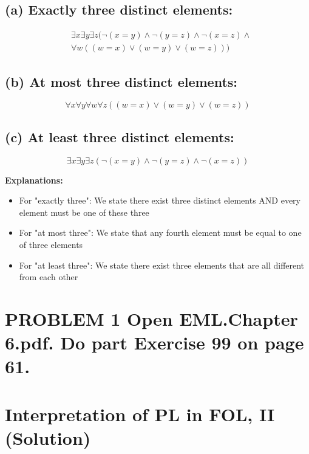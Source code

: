 \documentclass{article}
\begin{document}
\subsection*{(a) Exactly three distinct elements:}
\[\begin{aligned}
& \exists x \exists y \exists z (\neg(x = y) \land \neg(y = z) \land \neg(x = z) \land \\
& \forall w ((w = x) \lor (w = y) \lor (w = z)))
\end{aligned}\]

\subsection*{(b) At most three distinct elements:}
\[\forall x \forall y \forall w \forall z ((w = x) \lor (w = y) \lor (w = z))\]

\subsection*{(c) At least three distinct elements:}
\[\exists x \exists y \exists z (\neg(x = y) \land \neg(y = z) \land \neg(x = z))\]

\textbf{Explanations:}
\begin{itemize}
    \item For "exactly three": We state there exist three distinct elements AND every element must be one of these three
    \item For "at most three": We state that any fourth element must be equal to one of three elements
    \item For "at least three": We state there exist three elements that are all different from each other
\end{itemize}

\vspace{1em}


\vspace{1em}

\newpage

\section*{PROBLEM 1 Open EML.Chapter 6.pdf. Do part Exercise 99 on page 61.}

\section*{Interpretation of PL in FOL, II (Solution)}
\end{document}
